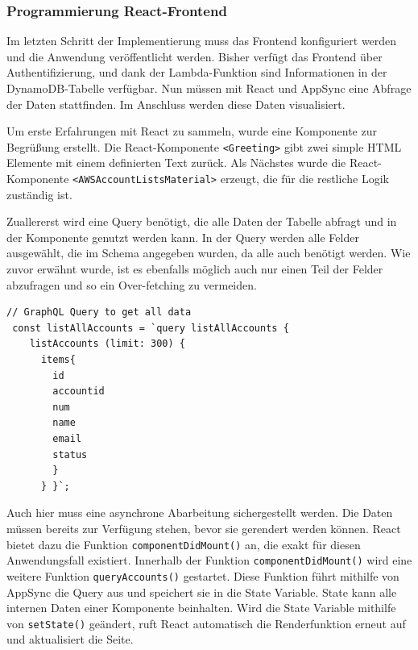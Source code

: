 \subsubsection{Programmierung React-Frontend}
\label{ReactFrontend}
Im letzten Schritt der Implementierung muss das Frontend konfiguriert werden und die Anwendung veröffentlicht werden.
Bisher verfügt das Frontend über Authentifizierung, und dank der Lambda-Funktion sind Informationen in der DynamoDB-Tabelle verfügbar.
Nun müssen mit React und AppSync eine Abfrage der Daten stattfinden.
Im Anschluss werden diese Daten visualisiert.

Um erste Erfahrungen mit React zu sammeln, wurde eine Komponente zur Begrüßung erstellt.
Die React-Komponente \verb+<Greeting>+ gibt zwei simple HTML Elemente mit einem definierten Text zurück.
Als Nächstes wurde die React-Komponente \verb+<AWSAccountListsMaterial>+ erzeugt, die für die restliche Logik zuständig ist.

Zuallererst wird eine Query benötigt, die alle Daten der Tabelle abfragt und in der Komponente genutzt werden kann.
In der Query werden alle Felder ausgewählt, die im Schema angegeben wurden, da alle auch benötigt werden.
Wie zuvor erwähnt wurde, ist es ebenfalls möglich auch nur einen Teil der Felder abzufragen und so ein Over-fetching zu vermeiden.

\begin{lstlisting}[basicstyle=\ttfamily\small, breaklines=true , frame = single, backgroundcolor=\color{flashwhite},caption={Query zum Accountaufruf (Datei: \textit{\nameref{lst:React AccountList}} )} ]
// GraphQL Query to get all data
 const listAllAccounts = `query listAllAccounts {
    listAccounts (limit: 300) {
      items{
        id
        accountid
        num
        name
        email
        status
        }
      } }`;
    \end{lstlisting}



Auch hier muss eine asynchrone Abarbeitung sichergestellt werden.
Die Daten müssen bereits zur Verfügung stehen, bevor sie gerendert werden können.
React bietet dazu die Funktion \verb+componentDidMount()+ an, die exakt für diesen Anwendungsfall existiert. \cite[]{ReactComp}
Innerhalb der Funktion \verb+componentDidMount()+ wird eine weitere Funktion \verb+queryAccounts()+ gestartet.
Diese Funktion führt mithilfe von AppSync die Query aus und speichert sie in die State Variable.\cite[]{AmplifyAPI}
State kann alle internen Daten einer Komponente beinhalten.
Wird die State Variable mithilfe von \verb+setState()+ geändert, ruft React automatisch die Renderfunktion erneut auf und aktualisiert die Seite.


